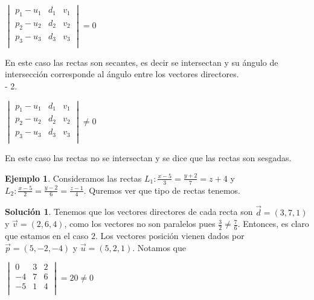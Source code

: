 \documentclass{article}
\theoremstyle{plain}
\theoremstyle{definition}
\newtheorem{ejem}[thm]{Ejemplo}
\newtheorem{sol}[thm]{Solución}
\begin{document}
\begin{center}
$\displaystyle \begin{vmatrix}
p_1-u_1 & d_1 & v_1 \\
p_2-u_2 & d_2 & v_2 \\
p_3-u_3 & d_3 & v_3 \\
\end{vmatrix} = 0$
\end{center}

En este caso las rectas son secantes, es decir se intersectan y su ángulo de intersección corresponde al ángulo entre los vectores directores. \\



- 2.

\begin{center}
$\displaystyle \begin{vmatrix}
p_1-u_1 & d_1 & v_1 \\
p_2-u_2 & d_2 & v_2 \\
p_3-u_3 & d_3 & v_3 \\
\end{vmatrix} \neq 0$
\end{center}

En este caso las rectas  no se intersectan y se dice que las rectas son sesgadas. \\


\begin{ejem}Consideramos las rectas  $\displaystyle L_1 :  \frac{x-5}{3} = \frac{y+2}{7}  = z+4 $ y $\displaystyle L_2 :  \frac{x-5}{2} = \frac{y-2}{6}  = \frac{z-1}{4} $. Quremos ver que tipo de rectas tenemos. \\
\end{ejem}

\begin{sol}Tenemos que los vectores directores de cada recta son $\overrightarrow{d}= (3,7,1)$ y $\overrightarrow{v}=(2,6,4)$, como los vectores no son paralelos pues $\displaystyle \frac{3}{2} \neq \frac{7}{6}$. Entonces, es claro que estamos en el caso $2$. Los vectores posición vienen dados por $\overrightarrow{p}=(5,-2,-4)$ y $\overrightarrow{u}=(5,2,1)$. Notamos que
\end{sol}

\begin{center}
$\displaystyle \begin{vmatrix}
0 & 3 & 2 \\
-4 & 7 & 6 \\
-5 & 1 & 4 \\
\end{vmatrix} = 20 \neq 0$
\end{center}
\end{document}
